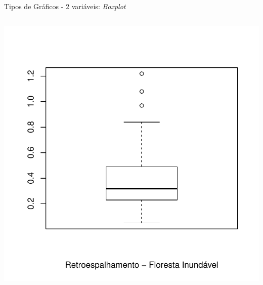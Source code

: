 \documentclass{beamer}\usepackage[]{graphicx}\usepackage[]{color}
\newenvironment{knitrout}{}{} %
\renewenvironment{knitrout}{\setlength{\topsep}{0mm}}{}
\begin{document}
\begin{frame}[fragile]{Tipos de Gráficos - 2 variáveis: \emph{Boxplot}}
\begin{columns}[t]
\begin{knitrout}
\color{fgcolor}
\includegraphics[width=1\linewidth]{figure/unnamed-chunk-71-1} 

\end{knitrout}

\end{columns}

\end{frame}
\end{document}
